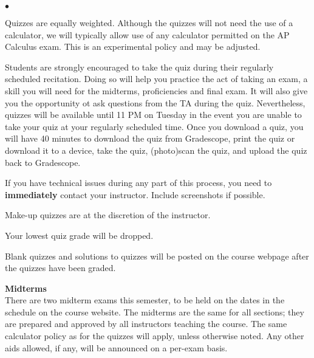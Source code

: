 \documentclass[12pt]{article}
\renewcommand{\emph}[1]{\textsf{\textbf{#1}}}
\newcommand{\localhead}[1]{\par\smallskip\textbf{#1}\nobreak\\}%
\def\heading#1{\localhead{\large\emph{#1}}}
\newenvironment{clist}%
{\bgroup\parskip 0pt\begin{list}{$\bullet$}{\partopsep 4pt\topsep 0pt\itemsep -2pt}}%
{\end{list}\egroup}%
\begin{document}
\begin{clist}
\item Quizzes are equally weighted.  
Although the quizzes will not need the use of a calculator, 
we will typically allow use of 
any calculator permitted on the AP Calculus exam.  This
is an experimental policy and may be adjusted.



\item Students are strongly encouraged to take the quiz during their
regularly scheduled recitation.  Doing so will help you practice the
act of taking an exam, a skill you will need for the midterms, proficiencies and final exam.  It will also give you the opportunity ot ask questions from the TA during the quiz. Nevertheless, quizzes will be available until 11 PM on Tuesday in the event you are unable to 
take your quiz at your regularly scheduled time.  Once you download a  quiz, you will have 40 minutes to download the quiz from  Gradescope, print the quiz or download it to a device, take the quiz, (photo)scan the quiz, and upload the quiz back to Gradescope. 
\item If you have technical issues during any part of this process, you need to \emph{immediately} contact your instructor. Include screenshots if possible.
\item Make-up quizzes are at the discretion of the instructor.
\item Your lowest quiz grade will be dropped. 
\end{clist}

Blank quizzes and solutions to quizzes will be posted on the course webpage after the quizzes have been graded.

\heading{Midterms}
There are two midterm exams this semester, to be held on the dates in the schedule on the course website.  The midterms are the same for all sections; they are prepared and approved by all instructors teaching the course. The same
calculator policy as for the quizzes will apply, unless otherwise noted.
Any other aids allowed, if any, will be announced on a per-exam basis.
\end{document}
